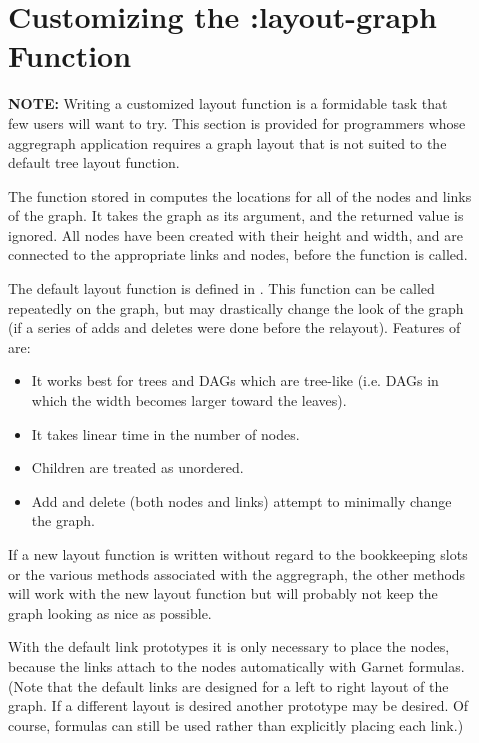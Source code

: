 \begin{description}
\item[] \section{Customizing the :layout-graph Function}
\label{layout-graph}

\item[] {\bf NOTE:}  Writing a customized layout function is a formidable task that
few users will want to try.  This section is provided for programmers whose
aggregraph application requires a graph layout that is not suited to the
default tree layout function.

\item[] The function stored in  computes the locations for all of
the nodes and links of the graph.
It takes the graph as its argument, and the returned value is ignored.
All nodes have been created with their height and width, and are
connected to the appropriate links and nodes, before the function is called.

\item[] The default layout function is  defined in .
This function can be called repeatedly
on the graph, but may drastically change the look of the graph (if a series
of adds and deletes were done before the relayout).  Features of
 are:

\begin{itemize}
\item It works best for trees and DAGs which are tree-like
(i.e. DAGs in which the width becomes larger toward the leaves).

\item It takes linear time in the number of nodes.

\item Children are treated as unordered.

\item Add and delete (both nodes and links) attempt to minimally change the
graph.
\end{itemize}

\item[] If a new layout function is written without regard to the bookkeeping
slots or the various methods associated with the aggregraph, the other methods
will work with the new layout function but will probably not keep the graph
looking as nice as possible.

\item[] With the default link prototypes it is only necessary to place the nodes,
because the links attach to the nodes automatically with Garnet formulas.
(Note that the default links are designed for a left to right layout of the
graph.  If a different layout is desired another prototype may be desired.  Of
course, formulas can still be used rather than explicitly placing each link.)


\end{description}
